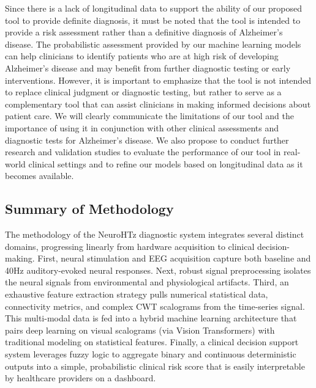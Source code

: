 \documentclass[openany]{book}
\begin{document}
Since there is a lack of longitudinal data to support the ability of our proposed tool to provide definite diagnosis, it must be noted that the tool is intended to provide a risk assessment rather than a definitive diagnosis of Alzheimer's disease. The probabilistic assessment provided by our machine learning models can help clinicians to identify patients who are at high risk of developing Alzheimer's disease and may benefit from further diagnostic testing or early interventions. However, it is important to emphasize that the tool is not intended to replace clinical judgment or diagnostic testing, but rather to serve as a complementary tool that can assist clinicians in making informed decisions about patient care. We will clearly communicate the limitations of our tool and the importance of using it in conjunction with other clinical assessments and diagnostic tests for Alzheimer's disease. We also propose to conduct further research and validation studies to evaluate the performance of our tool in real-world clinical settings and to refine our models based on longitudinal data as it becomes available. \\

\subsection{Summary of Methodology}
The methodology of the NeuroHTz diagnostic system integrates several distinct domains, progressing linearly from hardware acquisition to clinical decision-making. First, neural stimulation and EEG acquisition capture both baseline and 40Hz auditory-evoked neural responses. Next, robust signal preprocessing isolates the neural signals from environmental and physiological artifacts. Third, an exhaustive feature extraction strategy pulls numerical statistical data, connectivity metrics, and complex CWT scalograms from the time-series signal. This multi-modal data is fed into a hybrid machine learning architecture that pairs deep learning on visual scalograms (via Vision Transformers) with traditional modeling on statistical features. Finally, a clinical decision support system leverages fuzzy logic to aggregate binary and continuous deterministic outputs into a simple, probabilistic clinical risk score that is easily interpretable by healthcare providers on a dashboard.
\end{document}
